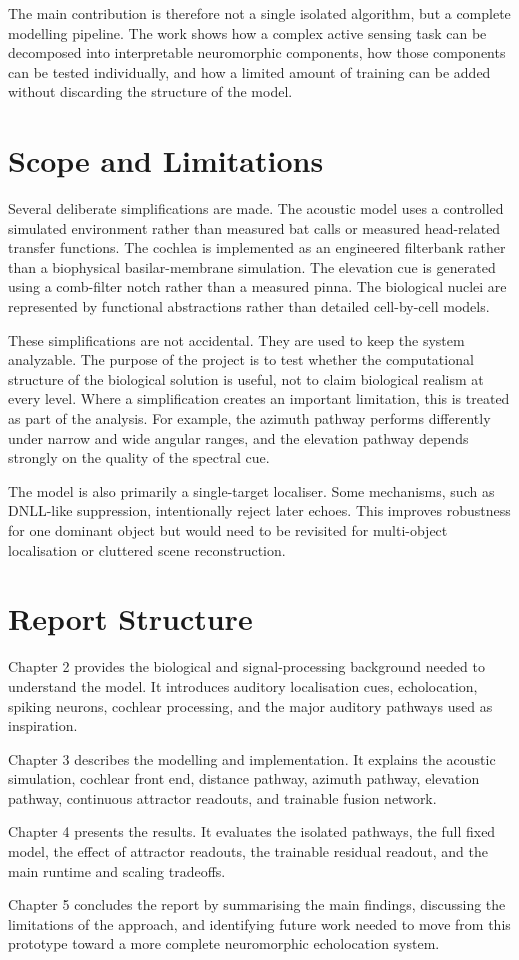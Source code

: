 The main contribution is therefore not a single isolated algorithm, but a complete modelling pipeline. The work shows how a complex active sensing task can be decomposed into interpretable neuromorphic components, how those components can be tested individually, and how a limited amount of training can be added without discarding the structure of the model.

\section{Scope and Limitations}

Several deliberate simplifications are made. The acoustic model uses a controlled simulated environment rather than measured bat calls or measured head-related transfer functions. The cochlea is implemented as an engineered filterbank rather than a biophysical basilar-membrane simulation. The elevation cue is generated using a comb-filter notch rather than a measured pinna. The biological nuclei are represented by functional abstractions rather than detailed cell-by-cell models.

These simplifications are not accidental. They are used to keep the system analyzable. The purpose of the project is to test whether the computational structure of the biological solution is useful, not to claim biological realism at every level. Where a simplification creates an important limitation, this is treated as part of the analysis. For example, the azimuth pathway performs differently under narrow and wide angular ranges, and the elevation pathway depends strongly on the quality of the spectral cue.

The model is also primarily a single-target localiser. Some mechanisms, such as DNLL-like suppression, intentionally reject later echoes. This improves robustness for one dominant object but would need to be revisited for multi-object localisation or cluttered scene reconstruction.

\section{Report Structure}

Chapter 2 provides the biological and signal-processing background needed to understand the model. It introduces auditory localisation cues, echolocation, spiking neurons, cochlear processing, and the major auditory pathways used as inspiration.

Chapter 3 describes the modelling and implementation. It explains the acoustic simulation, cochlear front end, distance pathway, azimuth pathway, elevation pathway, continuous attractor readouts, and trainable fusion network.

Chapter 4 presents the results. It evaluates the isolated pathways, the full fixed model, the effect of attractor readouts, the trainable residual readout, and the main runtime and scaling tradeoffs.

Chapter 5 concludes the report by summarising the main findings, discussing the limitations of the approach, and identifying future work needed to move from this prototype toward a more complete neuromorphic echolocation system.
